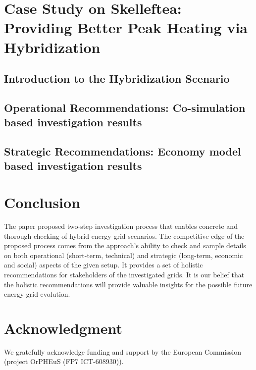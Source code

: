 \documentclass[review]{elsarticle}
\begin{document}
\section{Case Study on Skelleftea: Providing Better Peak  Heating via Hybridization}
\subsection{Introduction to the Hybridization Scenario} 

\subsection{Operational Recommendations: Co-simulation based investigation results}

\subsection{Strategic Recommendations: Economy model based
  investigation results} 

\section{Conclusion}
The paper proposed two-step investigation process that enables
concrete and thorough checking of hybrid energy grid scenarios. The
competitive edge of the proposed process comes from the approach's
ability to check and  sample details on both operational
(short-term, technical) and strategic (long-term, economic and
social) aspects of the given setup. It provides a set of holistic
recommendations for stakeholders of the investigated grids. It is our 
belief that the holistic recommendations will provide valuable
insights for the possible future energy grid evolution.

\section*{Acknowledgment}
We gratefully acknowledge funding and support by the European
Commission (project OrPHEuS (FP7 ICT-608930)). 


%

\end{document}
